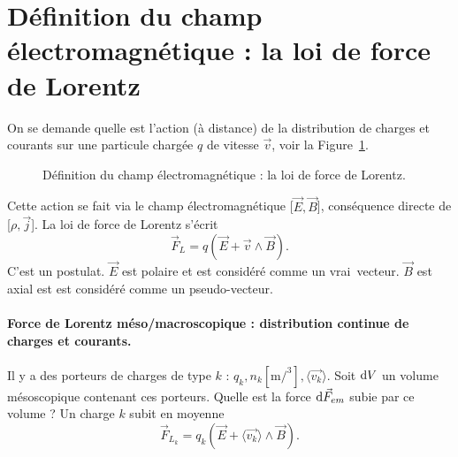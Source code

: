\section[La loi de force de Lorentz]{Définition du champ électromagnétique : la loi de force de Lorentz}

    On se demande quelle est l'action (à distance) de la distribution de charges et courants sur une particule chargée $q$ de vitesse $\vec{v}$, voir la Figure~\ref{fig:definition_champ_em_loi_force_lorentz}.

    \begin{figure}
        \centering
        \caption{Définition du champ électromagnétique : la loi de force de Lorentz.}    
        \label{fig:definition_champ_em_loi_force_lorentz}
    \end{figure}

    Cette action se fait via le champ électromagnétique [$\vec{E},\vec{B}$], conséquence directe de [$\rho,\vec{j}$]. La loi de force de Lorentz s'écrit
    \begin{equation*}
        \boxed{
            \vec{F}_L = q\left(\vec{E}+\vec{v}\wedge\vec{B}\right).
        }
    \end{equation*}
    C'est un postulat. $\vec{E}$ est polaire et est considéré comme un \og vrai\fg~vecteur. $\vec{B}$ est axial est est considéré comme un \og pseudo-vecteur\fg.

    \paragraph{Force de Lorentz méso/macroscopique : distribution continue de charges et courants.}

        Il y a des porteurs de charges de type $k$ : $q_k,n_k [\si{\metre\per\cubed}],\langle\vec{v_k}\rangle$. Soit $\mathrm{d} V$ un volume mésoscopique contenant ces porteurs. Quelle est la force $\mathrm{d}\vec{F}_{em}$ subie par ce volume ? Un charge $k$ subit en moyenne 
        \begin{equation*}
            \vec{F}_{L_k}=q_k\left(\vec{E}+\langle\vec{v_k}\rangle\wedge \vec{B}\right).
        \end{equation*}

